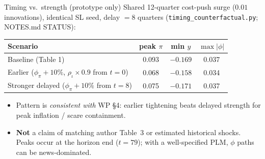 \documentclass[11pt,aspectratio=169]{beamer}
\begin{document}
\begin{frame}{Timing vs.\ strength (prototype only)}
  Shared 12-quarter cost-push surge ($0.01$ innovations), identical SL
  seed, delay $=8$ quarters
  (\texttt{timing\_counterfactual.py}; NOTES.md STATUS):
  \begin{center}
  {\footnotesize
  \begin{tabular}{@{}lccc@{}}
    \toprule
    Scenario & peak $\pi$ & min $y$ & $\max|\phi|$ \\
    \midrule
    Baseline (Table 1) & 0.093 & $-0.169$ & 0.037 \\
    Earlier ($\phi_\pi{+}10\%$, $\rho_\iota\times 0.9$ from $t=0$)
      & 0.068 & $-0.158$ & 0.034 \\
    Stronger delayed ($\phi_\pi{+}10\%$ from $t=8$)
      & 0.075 & $-0.171$ & 0.037 \\
    \bottomrule
  \end{tabular}
  }
  \end{center}
  \begin{itemize}
    \item Pattern is \emph{consistent with} WP \S4: earlier tightening
          beats delayed strength for peak inflation / scare containment.
    \item \textbf{Not} a claim of matching author Table~3 or estimated
          historical shocks. Peaks occur at the horizon end ($t=79$);
          with a well-specified PLM, $\phi$ paths can be news-dominated.
  \end{itemize}
\end{frame}
\end{document}
